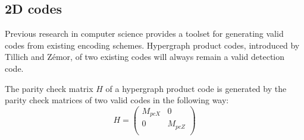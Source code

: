 \subsection{2D codes}
Previous research in computer science 
provides a toolset for generating valid codes
from existing encoding schemes. 
Hypergraph product codes, introduced by Tillich and Z\'emor,
of two 
existing codes will always remain a valid detection code.

The parity check matrix $H$ of a hypergraph product code is generated
by the parity check matrices of two valid codes in the following
way:
\begin{equation}
	H = \left(\begin{array}{cc}
		M_{pcX} & 0 \\
		0 & M_{pcZ} \\
	\end{array}\right)
\end{equation}





